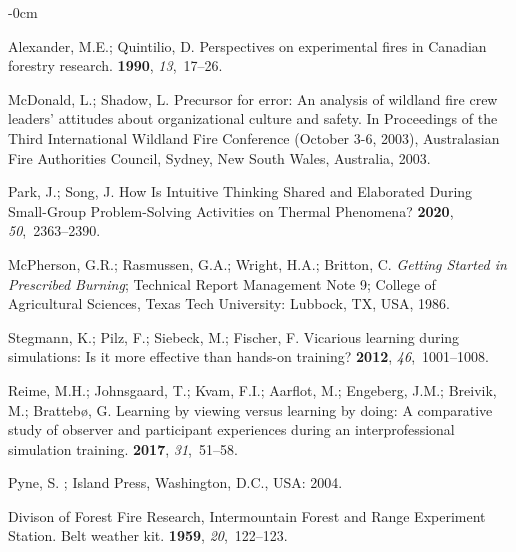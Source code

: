 \documentclass[fire,casereport,accept,moreauthors,pdftex]{Definitions/mdpi}  %
\begin{document}
\begin{adjustwidth}{-\extralength}{0cm}
\begin{thebibliography}{999}
Alexander, M.E.; Quintilio, D.
\newblock Perspectives on experimental fires in Canadian forestry research.
 {\bf 1990}, {\em
  13},~17--26.

McDonald, L.; Shadow, L.
\newblock Precursor for error: An analysis of wildland fire crew leaders’
  attitudes about organizational culture and safety.
\newblock In Proceedings of the Third International Wildland Fire Conference (October 3-6, 2003),
  Australasian Fire Authorities Council, Sydney, New South Wales, Australia,
  {2003}. %

Park, J.; Song, J.
\newblock How Is Intuitive Thinking Shared and Elaborated During Small-Group
  Problem-Solving Activities on Thermal Phenomena?
 {\bf 2020}, {\em 50},~2363--2390.

McPherson, G.R.; Rasmussen, G.A.; Wright, H.A.; Britton, C.
\newblock \emph{Getting Started in Prescribed Burning};
\newblock Technical Report Management Note 9; College of Agricultural Sciences, 
  Texas Tech University: Lubbock, TX, USA, 1986.

Stegmann, K.; Pilz, F.; Siebeck, M.; Fischer, F.
\newblock Vicarious learning during simulations: Is it more effective than
  hands-on training?
 {\bf 2012}, {\em 46},~1001--1008.

Reime, M.H.; Johnsgaard, T.; Kvam, F.I.; Aarflot, M.; Engeberg, J.M.; Breivik,
  M.; Bratteb{\o}, G.
\newblock Learning by viewing versus learning by doing: A comparative study of
  observer and participant experiences during an interprofessional simulation
  training.
 {\bf 2017}, {\em 31},~51--58.

Pyne, S.
;{ Island
  Press, Washington, D.C., USA}: 2004. %

{Divison of Forest Fire Research, Intermountain Forest and Range Experiment
  Station}.
\newblock Belt weather kit.
 {\bf 1959}, {\em 20},~122--123.


\end{thebibliography}
\end{adjustwidth}
\end{document}
